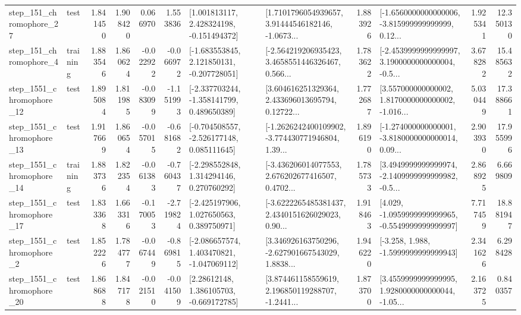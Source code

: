 \begin{tabular}{llrrrrllrlrr}
  step\_151\_chromophore\_27 &      test &      1.841450 &    1.908420 &      0.066970 &  1.553836 &    [1.001813117, 2.428324198, -0.151494372] &  [1.7101796054939657, 3.91444546182146, -1.0673... &       1.883926 &  [-1.6560000000000006, -3.815999999999999, 0.12... &            1.925341 &         12.350130 \\
   step\_151\_chromophore\_4 &  training &      1.883546 &    1.860624 &     -0.022922 & -0.066972 &   [-1.683553845, 2.121850131, -0.207728051] &  [-2.564219206935423, 3.4658551446326467, 0.566... &       1.783622 &  [-2.4539999999999997, 3.1900000000000004, -0.5... &            3.678282 &         15.485632 \\
 step\_1551\_chromophore\_12 &      test &      1.895084 &    1.811985 &     -0.083099 & -1.151993 &   [-2.337703244, -1.358141799, 0.489650389] &  [3.604616251329364, 2.433696013695794, 0.12722... &       1.772687 &  [3.557000000000002, 1.8170000000000002, -1.016... &            5.030449 &         17.388661 \\
 step\_1551\_chromophore\_13 &      test &      1.917669 &    1.860654 &     -0.057015 & -0.681682 &   [-0.704508557, -2.526177148, 0.085111645] &  [-1.2626242400109902, -3.774430771946804, 1.39... &       1.896190 &  [-1.274000000000001, -3.8180000000000014, 0.09... &            2.903930 &         17.955996 \\
 step\_1551\_chromophore\_14 &  training &      1.883736 &    1.822354 &     -0.061383 & -0.760437 &    [-2.298552848, 1.314294146, 0.270760292] &  [-3.436206014077553, 2.676202677416507, 0.4702... &       1.785733 &  [3.4949999999999974, -2.1409999999999982, -0.5... &            2.868925 &          6.669809 \\
 step\_1551\_chromophore\_17 &      test &      1.833368 &    1.663316 &     -0.170053 & -2.719824 &    [-2.425197906, 1.027650563, 0.389750971] &  [-3.6222265485381437, 2.4340151626029023, 0.90... &       1.918463 &  [4.029, -1.0959999999999965, -0.5549999999999997] &            7.717459 &         18.881947 \\
  step\_1551\_chromophore\_2 &      test &      1.852226 &    1.784777 &     -0.067449 & -0.869815 &   [-2.086657574, 1.403470821, -1.047069112] &  [3.346926163750296, -2.627901667543029, 1.8838... &       1.946220 &               [-3.258, 1.988, -1.5999999999999943] &            2.341626 &          6.298428 \\
 step\_1551\_chromophore\_20 &      test &      1.868688 &    1.847178 &     -0.021510 & -0.041509 &     [2.28612148, 1.386105703, -0.669172785] &  [3.874461158559619, 2.196850119288707, -1.2441... &       1.873700 &  [3.4559999999999995, 1.9280000000000044, -1.05... &            2.163725 &          0.840357 \\

\end{tabular}
